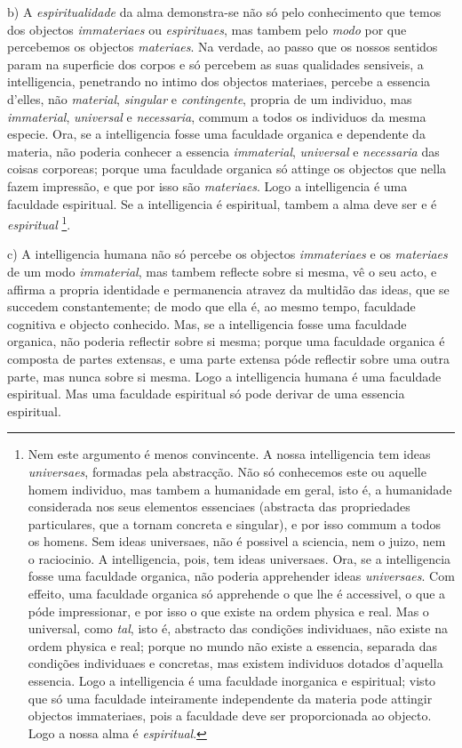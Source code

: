 b) A \emph{espiritualidade} da alma demonstra-se não só pelo conhecimento que temos dos objectos \emph{immateriaes} ou \emph{espirituaes}, mas tambem pelo \emph{modo} por que percebemos os objectos \emph{materiaes}. Na verdade, ao passo que os nossos sentidos param na superficie dos corpos e só percebem as suas qualidades sensiveis, a intelligencia, penetrando no intimo dos objectos materiaes, percebe a essencia d'elles, não \emph{material}, \emph{singular} e \emph{contingente}, propria de um individuo, mas \emph{immaterial}, \emph{universal} e \emph{necessaria}, commum a todos os individuos da mesma especie. Ora, se a intelligencia fosse uma faculdade organica e dependente da materia, não poderia conhecer a essencia \emph{immaterial}, \emph{universal} e \emph{necessaria} das coisas corporeas; porque uma faculdade organica só attinge os objectos que nella fazem impressão, e que por isso são \emph{materiaes}. Logo a intelligencia   é uma faculdade espiritual. Se a intelligencia é espiritual, tambem a alma deve ser e é \emph{espiritual} \footnote{Nem este argumento é menos convincente. A nossa intelligencia tem ideas \emph{universaes}, formadas pela abstracção. Não só conhecemos este ou aquelle homem individuo, mas tambem a humanidade em geral, isto é, a humanidade considerada nos seus elementos essenciaes (abstracta das propriedades particulares, que a tornam concreta e singular), e por isso commum a todos os homens. Sem ideas universaes, não é possivel a sciencia, nem o juizo, nem o raciocinio. A intelligencia, pois, tem ideas universaes. Ora, se a intelligencia fosse uma faculdade organica, não poderia apprehender ideas \emph{universaes}. Com effeito, uma faculdade organica só apprehende o que lhe é accessivel, o que a póde impressionar, e por isso o que existe na ordem physica e real. Mas o universal, como \emph{tal}, isto é, abstracto das condições individuaes, não existe na ordem physica e real; porque no mundo não existe a essencia, separada das condições individuaes e concretas, mas existem individuos dotados d'aquella essencia. Logo a intelligencia é uma faculdade inorganica e espiritual; visto que só uma faculdade inteiramente independente da materia pode attingir objectos immateriaes, pois a faculdade deve ser proporcionada ao objecto. Logo a nossa alma é \emph{espiritual}.}.

c) A intelligencia humana não só percebe os objectos \emph{immateriaes} e os \emph{materiaes} de um modo \emph{immaterial}, mas tambem reflecte sobre si mesma, vê o seu acto, e affirma a propria identidade e permanencia atravez da multidão das ideas, que se succedem constantemente; de modo que ella é, ao mesmo tempo, faculdade cognitiva e objecto conhecido. Mas, se a intelligencia fosse uma faculdade organica, não poderia reflectir sobre si mesma; porque uma faculdade organica é composta de partes extensas, e uma parte extensa póde reflectir sobre uma outra parte, mas nunca sobre si mesma. Logo a intelligencia humana é uma faculdade espiritual. Mas uma faculdade espiritual só pode derivar de uma essencia espiritual.


